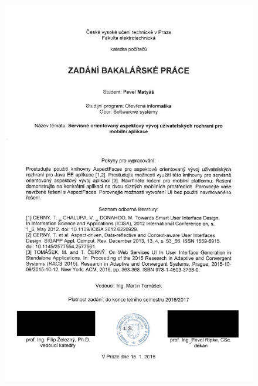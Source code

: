 \documentclass[11pt,twoside,a4paper]{book}
\begin{document}
	
	\translate				%

	{
	 \cleardoublepage \thispagestyle{empty}
	\begin{figure}
	\begin{center}
	\includegraphics[width=\textwidth, height=\textheight]{figures/zadani}
	\end{center}
	\end{figure}
	\newpage
	}
\end{document}
